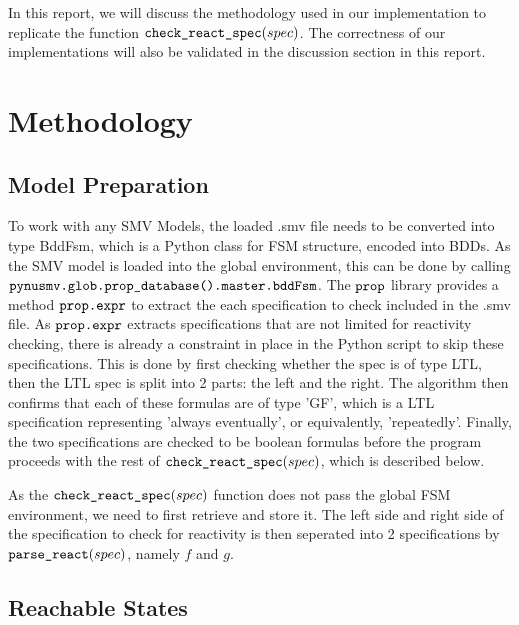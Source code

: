 \documentclass{article}
\begin{document}
\medskip

In this report, we will discuss the methodology used in our implementation to replicate the function $\verb|check_react_spec|(spec)$. The correctness of our implementations will also be validated in the discussion section in this report.

\section{Methodology}

\subsection{Model Preparation}

To work with any SMV Models, the loaded .smv file needs to be converted into type BddFsm, which is a Python class for FSM structure, encoded into BDDs. As the SMV model is loaded into the global environment, this can be done by calling $\verb|pynusmv.glob.prop_database().master.bddFsm|$. The $\verb|prop|$ library provides a method $\verb|prop.expr|$ to extract the each specification to check included in the .smv file. As $\verb|prop.expr|$ extracts specifications that are not limited for reactivity checking, there is already a constraint in place in the Python script to skip these specifications. This is done by first checking whether the spec is of type LTL, then the LTL spec is split into 2 parts: the left and the right. The algorithm then confirms that each of these formulas are of type 'GF', which is a LTL specification representing 'always eventually', or equivalently, 'repeatedly'. Finally, the two specifications are checked to be boolean formulas before the program proceeds with the rest of $\verb|check_react_spec|(spec)$, which is described below.

\medskip

As the $\verb|check_react_spec|(spec)$ function does not pass the global FSM environment, we need to first retrieve and store it. The left side and right side of the specification to check for reactivity is then seperated into 2 specifications by $\verb|parse_react|(spec)$, namely $f$ and $g$.

\subsection{Reachable States}
\end{document}
